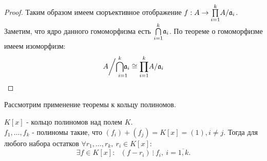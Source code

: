\begin{proof}
Таким образом имеем сюръективное отображение $f: A \rightarrow \underset{i = 1}{\overset{k}\prod} A/\mathfrak{a}_i$. \\
Заметим, что ядро данного гомоморфизма есть $\underset{i = 1}{\overset{k}\bigcap}\mathfrak{a}_i$. По теореме о гомоморфизме
имеем изоморфизм:
\[A\bigg/\underset{i = 1}{\overset{k}\bigcap \mathfrak{a}_i} \cong \underset{i = 1}{\overset{k}\prod} A/\mathfrak{a}_i\]
\end{proof}

Рассмотрим применение теоремы к кольцу полиномов.

\begin{thm}
$K[x]$ - кольцо полиномов над полем $K$.\\
$f_1, \dots, f_k$ - полиномы такие, что $(f_i) + (f_j) = K[x] = (1), i \neq j$.
Тогда для любого набора остатков $\forall r_1, \dots, r_k, ~r_i \in K[x]$:
\[\exists f \in K[x]:~~~(f - r_i)~\vdots~f_i, ~i = \overline{1, k}.\]
\end{thm}

